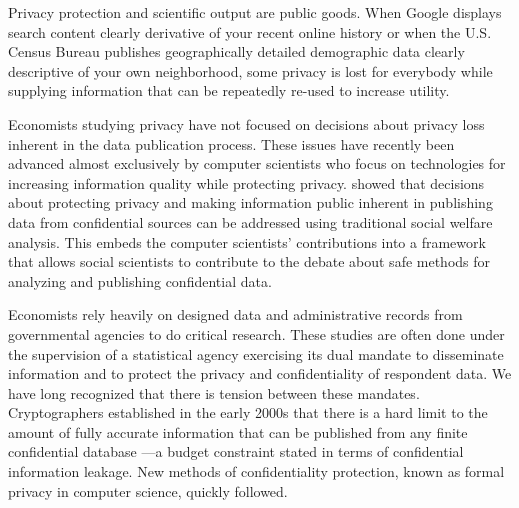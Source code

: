 \documentclass[finalmode,PP]{AEA}
\begin{document}

\title{\mytitle}
\author{\myauthors}

\date{\today}
\pubVolume{\color{red}\today}
\pubIssue{\color{red}\currenttime}
\maketitle




Privacy protection and scientific output are public goods. When Google displays search content clearly derivative of your recent online history or when the U.S. Census Bureau publishes geographically detailed demographic data clearly descriptive of your own neighborhood, some privacy is lost for everybody while supplying information that can be repeatedly re-used to increase utility.

Economists studying privacy have not focused on decisions about privacy loss inherent in the data publication process. These issues have recently been advanced almost exclusively by computer scientists who focus on technologies for increasing information quality while protecting privacy.
%
\citet{abowdschmutte.aer.2018} showed that decisions about protecting privacy and making information public inherent in publishing data from confidential sources can be addressed using traditional social welfare analysis.
This embeds the computer scientists' contributions into a framework that allows social scientists to contribute to the debate about safe methods for analyzing and publishing confidential data.

Economists rely heavily on designed data and administrative records from governmental agencies to do critical research.
These studies are often done under the supervision of a statistical agency exercising its dual mandate to disseminate
information and to protect the privacy and confidentiality of respondent data. We have long recognized that there is
tension between these mandates. Cryptographers established in the early 2000s that there is a hard limit to the amount
of fully accurate information that can be published from any finite confidential database \citep{Dinur:2003:RIW:773153.773173}---a
budget constraint stated in terms of confidential information leakage. New methods of
confidentiality protection, known as formal privacy in computer science, quickly followed.
\end{document}
